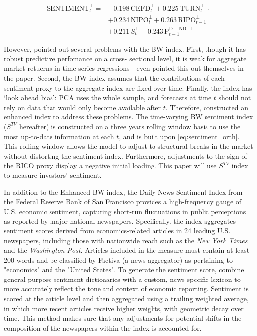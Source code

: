 \begin{equation} %
    \label{eq:sentiment_orth}
    \begin{split}
    \text{SENTIMENT}^{\perp}_t = &-0.198\,\text{CEFD}^{\perp}_t + 0.225\,\text{TURN}^{\perp}_{t-1} \\
    &+ 0.234\,\text{NIPO}^{\perp}_t + 0.263\,\text{RIPO}^{\perp}_{t-1} \\
    &+ 0.211\,S^{\perp}_t - 0.243\,\text{P}^{\text{D} - \text{ND},\perp}_{t-1}
    \end{split}
\end{equation}

However,  pointed out several problems with the BW index. First, though it has robust predictive perfomance on a cross- sectional level, it is weak for aggregate market retuerns in time series regressions - even  pointed this out themselves in the paper. Second, the BW index assumes that the contributions of each sentiment proxy to the aggregate index are fixed over time. Finally, the index has `look ahead bias': PCA uses the whole sample, and forecasts at time $t$ should not rely on data that would only become available after $t$. Therefore,  constructed an enhanced index to address these problems. The time-varying BW sentiment index ($S^{TV}$ hereafter) is constructed on a three years rolling window basis to use the most up-to-date information at each $t$, and is built upon \cref{eq:sentiment_orth}. This rolling window allows the model to adjust to structural breaks in the market without distorting the sentiment index. Furthermore, adjustments to the sign of the RICO proxy display a negative initial loading. This paper will use  $S^{TV}$ index to measure investors' sentiment.

In addition to the Enhanced BW index, the Daily News Sentiment Index from the Federal Reserve Bank of San Francisco provides a high-frequency gauge of U.S. economic sentiment, capturing short-run fluctuations in public perceptions as reported by major national newspapers. Specifically, the index aggregates sentiment scores derived from economics-related articles in 24 leading U.S. newspapers, including those with nationwide reach such as the \emph{New York Times} and the \emph{Washington Post}. Articles included in the measure must contain at least 200 words and be classified by Factiva (a news aggregator) as pertaining to "economics" and the "United States". To generate the sentiment score,  combine general-purpose sentiment dictionaries with a custom, news-specific lexicon to more accurately reflect the tone and context of economic reporting. Sentiment is scored at the article level and then aggregated using a trailing weighted average, in which more recent articles receive higher weights, with geometric decay over time. This method makes sure that any adjustments for potential shifts in the composition of the newspapers within the index is accounted for.

